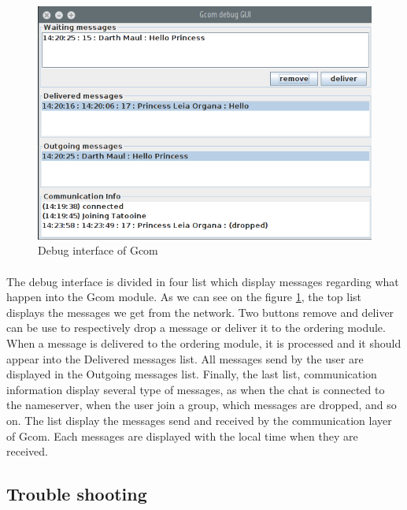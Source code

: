 \begin{figure}[h]
    \begin{center}
        \includegraphics[scale=0.5]{figures/debug_window.png}
    \end{center}
    \caption{Debug interface of Gcom}
    \label{fig:debug_gui}
\end{figure}

\paragraph{}{
    The debug interface is divided in four list which display messages
 regarding what happen into the Gcom module. As we can see on the figure
 \ref{fig:debug_gui}, the top list displays the messages we get from
 the network. Two buttons remove and deliver can be use to
 respectively drop a message or deliver it to the ordering module.
 When a message is delivered to the ordering module, it is processed
 and it should appear into the Delivered messages list. \newline
 All messages send by the user are displayed in the Outgoing messages
 list. Finally, the last list, communication information display
 several type of messages, as when the chat is connected to the
 nameserver, when the user join a group, which messages are
 dropped, and so on. The list display the messages send and received
 by the communication layer of Gcom. \newline
 Each messages are displayed with the local time when they are
 received.
}

\subsection{Trouble shooting}
